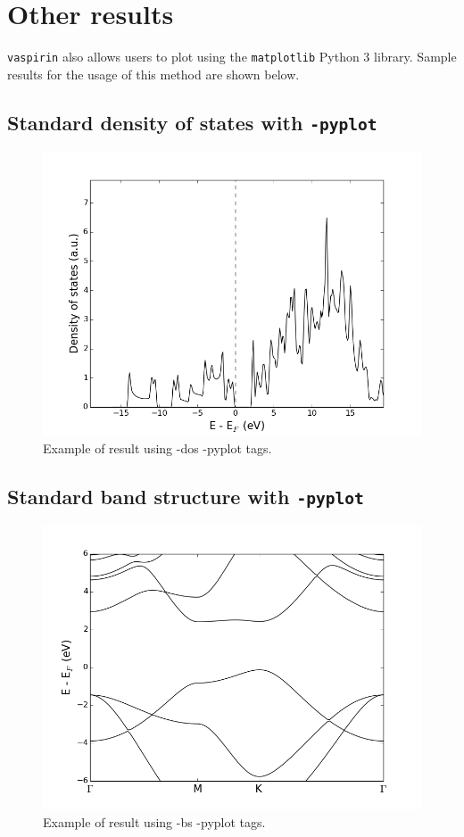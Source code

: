 \documentclass{refart}
\begin{document}
\section{Other results}

\texttt{vaspirin} also allows users to plot using the \texttt{matplotlib} Python 3 library. Sample results for the usage of this method are shown below.

\subsection{Standard density of states with \texttt{-pyplot}}

\begin{figure}[h!]
\centering
\includegraphics[width=0.90\columnwidth]{img/dos.png}
\caption{Example of result using -dos -pyplot tags.}
\label{fig:dos_pyplot}
\end{figure}


\subsection{Standard band structure with \texttt{-pyplot}}

\begin{figure}[h!]
\centering
\includegraphics[width=.9\columnwidth]{img/BandStructure.png}
\caption{Example of result using -bs -pyplot tags.}
\label{fig:bs_pyplot}
\end{figure}
\end{document}
